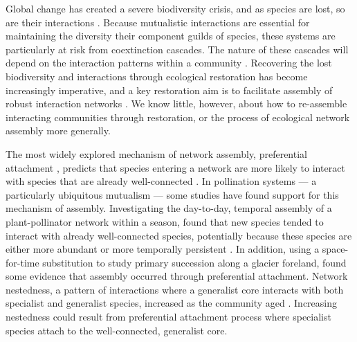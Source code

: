 \documentclass[12pt]{article}
\begin{document}
Global change has created a severe biodiversity crisis, and as species
are lost, so are their interactions \citep{dunn2009sixth,
  barnosky2011has}. Because mutualistic interactions are essential for
maintaining the diversity their component guilds of species, these
systems are particularly at risk from coextinction cascades. The
nature of these cascades will depend on the interaction patterns
within a community \citep{Memmott2004, Rezende2007,
  Bascompte2009}. Recovering the lost biodiversity and interactions
through ecological restoration has become increasingly imperative, and
a key restoration aim is to facilitate assembly of robust interaction
networks \citep{menz-2010-4}. We know little, however, about how to
re-assemble interacting communities through restoration, or the
process of ecological network assembly more generally.

The most widely explored mechanism of network assembly, preferential
attachment \citep{barabasi1999emergence}, predicts that species
entering a network are more likely to interact with species that are
already well-connected \citep[''the rich-get-richer''
principle,][]{barabasi1999emergence}. In pollination systems --- a
particularly ubiquitous mutualism \citep{ollerton-2011-321,
  klein-2007-303} --- some studies have found support for this
mechanism of assembly. Investigating the day-to-day, temporal assembly
of a plant-pollinator network within a season, \cite{Olesen2008} found
that new species tended to interact with already well-connected
species, potentially because these species are either more abundant or
more temporally persistent \citep{Olesen2008}. In addition, using a
space-for-time substitution to study primary succession along a
glacier foreland, \cite{albrecht2010plant} found some evidence that
assembly occurred through preferential attachment. Network nestedness,
a pattern of interactions where a generalist core interacts with both
specialist and generalist species, increased as the community aged
\citep{albrecht2010plant}. Increasing nestedness could result from
preferential attachment process where specialist species attach to the
well-connected, generalist core.  %
\end{document}
